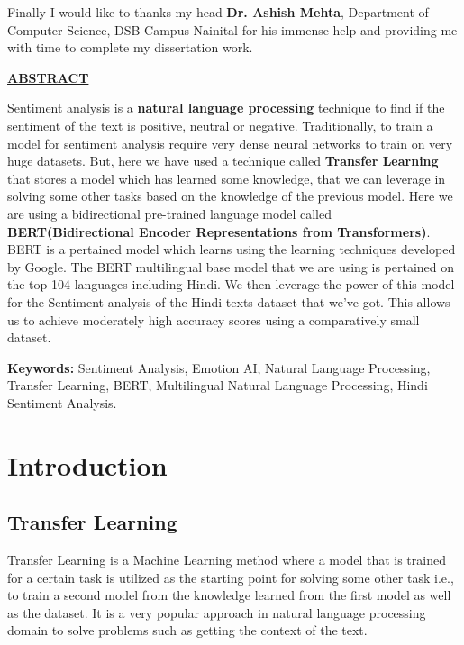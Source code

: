 \documentclass[a4paper, 12pt]{article}
\begin{document}
\begin{sloppypar}
Finally I would like to thanks my head \textbf{Dr. Ashish Mehta}, Department of Computer Science, DSB Campus Nainital for his immense help and providing me with time to complete my dissertation work.
\thispagestyle{empty}
\clearpage


\begin{center}
\textbf{\underline{ABSTRACT}} \\ [0.5ex]
\end{center}
 Sentiment analysis is a \textbf{natural language processing} technique to find if the sentiment of the text is positive, neutral or negative. Traditionally, to train a model for sentiment analysis require very dense neural networks to train on very huge datasets. But, here we have used a technique called \textbf{Transfer Learning} that stores a model which has learned some knowledge, that we can leverage in solving some other tasks based on the knowledge of the previous model. Here we are using a bidirectional pre-trained language model called  \textbf{BERT(Bidirectional Encoder Representations from Transformers)}. BERT is a pertained model which learns using the learning techniques developed by Google. The BERT multilingual base model that we are using is pertained on the top 104 languages including Hindi. We then leverage the power of this model for the Sentiment analysis of the Hindi texts dataset that we've got. This allows us to achieve moderately high accuracy scores using a comparatively small dataset.

\textbf{Keywords:} Sentiment Analysis, Emotion AI,  Natural Language Processing, Transfer Learning, BERT, Multilingual Natural Language Processing, Hindi Sentiment Analysis.
\thispagestyle{empty}
\clearpage
\tableofcontents
\thispagestyle{empty}
\clearpage
\listoffigures
\listoftables
\thispagestyle{empty}
\clearpage
\setcounter{page}{1}
\section{Introduction}

\subsection{Transfer Learning}
Transfer Learning is a Machine Learning method where a model that is trained for a certain task is utilized as the starting point for solving some other task i.e., to train a second model from the knowledge learned from the first model as well as the dataset. It is a very popular approach in natural language processing domain to solve problems such as getting the context of the text.


\end{sloppypar}
\end{document}
